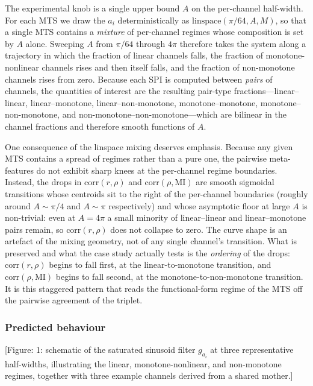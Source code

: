 \documentclass{article}
\theoremstyle{plain}
\theoremstyle{definition}
\theoremstyle{remark}
\newcommand{\figph}[1]{{\color{red}[Figure: #1]}}
\begin{document}
The experimental knob is a single upper bound $A$ on the per-channel half-width. For each MTS we draw the $a_i$ deterministically as $\mathrm{linspace}(\pi/64, A, M)$, so that a single MTS contains a \emph{mixture} of per-channel regimes whose composition is set by $A$ alone. Sweeping $A$ from $\pi/64$ through $4\pi$ therefore takes the system along a trajectory in which the fraction of linear channels falls, the fraction of monotone-nonlinear channels rises and then itself falls, and the fraction of non-monotone channels rises from zero. Because each SPI is computed between \emph{pairs} of channels, the quantities of interest are the resulting pair-type fractions---linear--linear, linear--monotone, linear--non-monotone, monotone--monotone, monotone--non-monotone, and non-monotone--non-monotone---which are bilinear in the channel fractions and therefore smooth functions of $A$.

One consequence of the linspace mixing deserves emphasis. Because any given MTS contains a spread of regimes rather than a pure one, the pairwise meta-features do not exhibit sharp knees at the per-channel regime boundaries. Instead, the drops in $\mathrm{corr}(r,\rho)$ and $\mathrm{corr}(\rho,\mathrm{MI})$ are smooth sigmoidal transitions whose centroids sit to the right of the per-channel boundaries (roughly around $A \sim \pi/4$ and $A \sim \pi$ respectively) and whose asymptotic floor at large $A$ is non-trivial: even at $A = 4\pi$ a small minority of linear--linear and linear--monotone pairs remain, so $\mathrm{corr}(r,\rho)$ does not collapse to zero. The curve shape is an artefact of the mixing geometry, not of any single channel's transition. What is preserved and what the case study actually tests is the \emph{ordering} of the drops: $\mathrm{corr}(r,\rho)$ begins to fall first, at the linear-to-monotone transition, and $\mathrm{corr}(\rho,\mathrm{MI})$ begins to fall second, at the monotone-to-non-monotone transition. It is this staggered pattern that reads the functional-form regime of the MTS off the pairwise agreement of the triplet.

\subsubsection{Predicted behaviour}

\figph{1: schematic of the saturated sinusoid filter $g_{a_i}$ at three representative half-widths, illustrating the linear, monotone-nonlinear, and non-monotone regimes, together with three example channels derived from a shared mother.}
\end{document}
